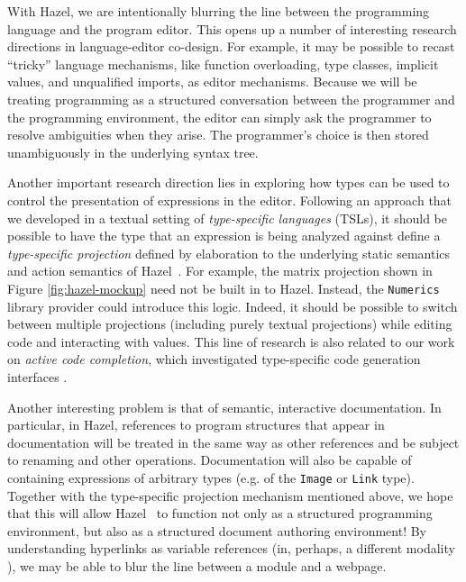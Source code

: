 \documentclass[letterpaper,USenglish]{lipics-v2016}
\let\li\lstinline
\newcommand{\Hazel}[0]{\textsf{Hazel}}
\newcommand{\HazelEnv}[0]{\Hazel}
\begin{document}
With \HazelEnv, we are intentionally blurring the line between the programming language and the program editor. This opens up a number of interesting research directions in {language-editor co-design}. For example, it may be possible to recast  ``tricky'' language mechanisms, like function overloading, type classes, implicit values, and unqualified imports, as editor mechanisms. Because we will be treating programming as a structured conversation between the programmer and the programming environment, the editor can simply ask the programmer to resolve ambiguities when they arise. The programmer's choice is then stored unambiguously in the underlying syntax tree.

Another important research
direction lies in exploring how types can be used to control  
the presentation of expressions in the editor. Following an
approach that we developed in a textual setting of \emph{type-specific
languages} (TSLs), it should be possible to have the type that an
expression is being analyzed against define a \emph{type-specific projection} defined by elaboration to the underlying static semantics and action semantics of \HazelEnv ~\cite{TSLs}. For example, the matrix projection shown in Figure \ref{fig:hazel-mockup} need not be built in to \HazelEnv. Instead, the \li{Numerics} library provider could introduce this logic. Indeed, it should be possible to switch between multiple projections (including purely textual projections) while editing code and interacting with values. This line of research is also related to our work on \emph{active code completion}, which investigated type-specific code generation interfaces \cite{Omar:2012:ACC:2337223.2337324}. 

Another interesting problem is that of {semantic, interactive documentation}. In particular, in \HazelEnv, references to program structures that appear in documentation will be treated in the same way as other references and be subject to renaming and other operations. Documentation will also be capable of containing expressions of arbitrary types (e.g. of the \li{Image} or \li{Link} type). Together with the type-specific projection mechanism mentioned above, we hope that this will allow \HazelEnv~ to function not only as a structured programming environment, but also as a {structured document authoring environment}! By understanding hyperlinks as variable references (in, perhaps, a different modality \cite{vii2007type}), we may be able to blur the line between a module and a webpage. %
\end{document}
